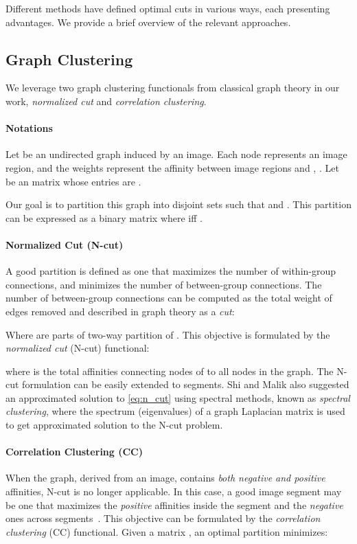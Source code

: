 \documentclass[10pt,twocolumn,letterpaper]{article}
\begin{document}
Different methods have defined optimal cuts in various ways, each presenting advantages. We provide a brief overview of the relevant approaches.

 \subsection{Graph Clustering}\label{c_func}
 We leverage two graph clustering functionals from classical graph theory in our work, \emph{normalized  cut}\cite{shi2000normalized} and \emph{correlation  clustering}\cite{bansal2004correlation}. 
 
\paragraph{Notations}
Let  be an undirected graph induced by an image. Each node represents an image region, and the weights  represent the affinity between image regions  and , . Let  be an  matrix whose entries are . 

Our goal is to partition this graph into  disjoint sets 
such that  and  .
This partition can be expressed as a binary matrix  where  iff .

\paragraph{Normalized Cut (N-cut)~\cite{shi2000normalized}}
A good partition is defined as one that maximizes the number of within-group
connections, and minimizes the number of between-group connections. The number of between-group connections 
can be computed as the total weight of edges removed and described in graph theory as a \emph{cut}:



Where  are parts of two-way partition of . This objective is formulated by the \emph{normalized cut} (N-cut) functional:

where  is the total affinities connecting nodes of  to all nodes in the graph.
The N-cut formulation can be easily extended to  segments. 
Shi and Malik \cite{shi2000normalized} also suggested an approximated solution to \cref{eq:n_cut} using spectral methods, known as \emph{spectral clustering}, where the spectrum (eigenvalues) of a graph Laplacian matrix is used to get approximated solution to the N-cut problem.


\paragraph{Correlation Clustering (CC)~\cite{bansal2004correlation}}
When the graph, derived from an image, contains \emph{both negative and positive} affinities, N-cut is no longer applicable. 
In this case, a good image segment may be one that maximizes the \emph{positive} affinities inside the segment and the \emph{negative} ones across segments~\cite{bansal2004correlation}. 
This objective can be formulated by the \emph{correlation clustering} (CC) functional. 
Given a matrix , an optimal partition  minimizes:
\end{document}

